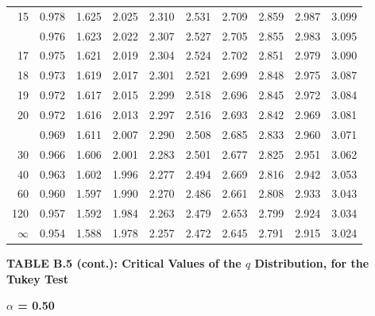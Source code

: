 \documentclass[10pt]{article}
\begin{document}
\begin{longtable}{@{}r!{\vrule width 0.8pt\hspace{0.55em}}rrrrrrrrr@{}}
15 & 0.978 & 1.625 & 2.025 & 2.310 & 2.531 & 2.709 & 2.859 & 2.987 & 3.099 \\
 & 0.976 & 1.623 & 2.022 & 2.307 & 2.527 & 2.705 & 2.855 & 2.983 & 3.095 \\
17 & 0.975 & 1.621 & 2.019 & 2.304 & 2.524 & 2.702 & 2.851 & 2.979 & 3.090 \\
18 & 0.973 & 1.619 & 2.017 & 2.301 & 2.521 & 2.699 & 2.848 & 2.975 & 3.087 \\
19 & 0.972 & 1.617 & 2.015 & 2.299 & 2.518 & 2.696 & 2.845 & 2.972 & 3.084 \\
20 & 0.972 & 1.616 & 2.013 & 2.297 & 2.516 & 2.693 & 2.842 & 2.969 & 3.081 \\
 & 0.969 & 1.611 & 2.007 & 2.290 & 2.508 & 2.685 & 2.833 & 2.960 & 3.071 \\
30 & 0.966 & 1.606 & 2.001 & 2.283 & 2.501 & 2.677 & 2.825 & 2.951 & 3.062 \\
40 & 0.963 & 1.602 & 1.996 & 2.277 & 2.494 & 2.669 & 2.816 & 2.942 & 3.053 \\
60 & 0.960 & 1.597 & 1.990 & 2.270 & 2.486 & 2.661 & 2.808 & 2.933 & 3.043 \\
120 & 0.957 & 1.592 & 1.984 & 2.263 & 2.479 & 2.653 & 2.799 & 2.924 & 3.034 \\
\addlinespace[0.30em]
$\infty$ & 0.954 & 1.588 & 1.978 & 2.257 & 2.472 & 2.645 & 2.791 & 2.915 & 3.024 \\
\end{longtable}
\newpage
\thispagestyle{empty}
\begin{center}
{\large\bfseries TABLE B.5 (cont.): Critical Values of the $q$ Distribution, for the Tukey Test\par}
\end{center}
{\large\bfseries $\alpha$ = 0.50\par}
\vspace{0.45em}
\small
\end{document}

